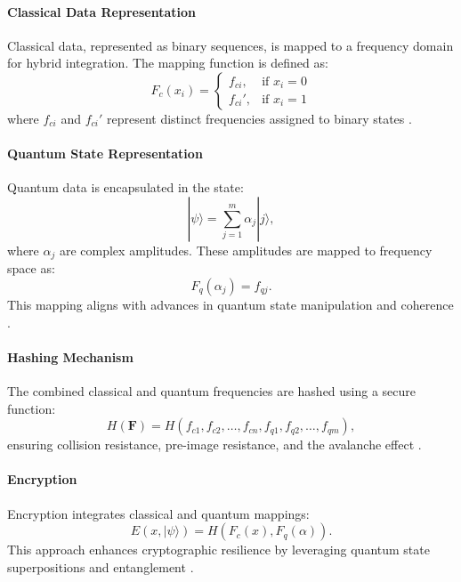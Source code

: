 \documentclass{article}
\theoremstyle{plain}
\begin{document}
\paragraph{Classical Data Representation}
Classical data, represented as binary sequences, is mapped to a frequency domain for hybrid integration. The mapping function is defined as:
\begin{equation}
F_c(x_i) = 
\begin{cases} 
f_{ci}, & \text{if } x_i = 0 \\
f_{ci}', & \text{if } x_i = 1
\end{cases}
\end{equation}
where \( f_{ci} \) and \( f_{ci}' \) represent distinct frequencies assigned to binary states \cite{bohr1987complementarity}.

\paragraph{Quantum State Representation}
Quantum data is encapsulated in the state:
\begin{equation}
|\psi\rangle = \sum_{j=1}^m \alpha_j |j\rangle,
\end{equation}
where \( \alpha_j \) are complex amplitudes. These amplitudes are mapped to frequency space as:
\begin{equation}
F_q(\alpha_j) = f_{qj}.
\end{equation}
This mapping aligns with advances in quantum state manipulation and coherence \cite{cohen2012quantum}.

\paragraph{Hashing Mechanism}
The combined classical and quantum frequencies are hashed using a secure function:
\begin{equation}
H(\mathbf{F}) = H(f_{c1}, f_{c2}, \ldots, f_{cn}, f_{q1}, f_{q2}, \ldots, f_{qm}),
\end{equation}
ensuring collision resistance, pre-image resistance, and the avalanche effect \cite{shor1994algorithms}.

\paragraph{Encryption}
Encryption integrates classical and quantum mappings:
\begin{equation}
E(x, |\psi\rangle) = H(F_c(x), F_q(\alpha)).
\end{equation}
This approach enhances cryptographic resilience by leveraging quantum state superpositions and entanglement \cite{grover1996fast}.
\end{document}
